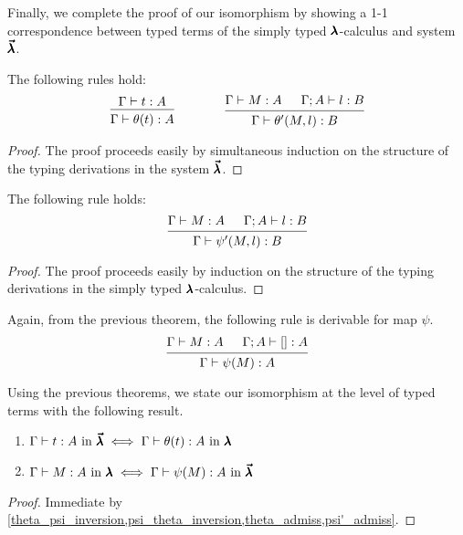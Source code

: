 Finally, we complete the proof of our isomorphism by showing a 1-1 correspondence between typed terms of the simply typed $\pmb{\lambda}$-calculus and system $\pmb{\vec \lambda}$.

\begin{theorem}
  \label{theta_admiss}
  The following rules hold:
  \[ \begin{prooftree}
      \hypo{ \Gamma \vdash t : A }
      \infer1{ \Gamma \vdash \theta(t) : A } 
    \end{prooftree}
    \qquad \qquad
    \begin{prooftree}
      \hypo{ \Gamma \vdash M : A }
      \hypo{ \Gamma ; A \vdash l : B }
      \infer2{ \Gamma \vdash \theta'(M, l) : B }.
    \end{prooftree} \]
\end{theorem}
\begin{proof}
  The proof proceeds easily by simultaneous induction on the structure of the typing derivations in the system $\pmb{\vec \lambda}$.
\end{proof}

\begin{theorem}
  \label{psi'_admiss}
  The following rule holds:
  \[ \begin{prooftree}
      \hypo{ \Gamma \vdash M : A }
      \hypo{ \Gamma ; A \vdash l : B }
      \infer2{ \Gamma \vdash \psi'(M, l) : B }.
    \end{prooftree} \]
\end{theorem}
\begin{proof}
  The proof proceeds easily by induction on the structure of the typing derivations in the simply typed $\pmb{\lambda}$-calculus.
\end{proof}

Again, from the previous theorem, the following rule is derivable for map $\psi$.
\[ \begin{prooftree}
    \hypo{ \Gamma \vdash M : A }
    \hypo{ \Gamma ; A \vdash [] : A }
    \infer2{ \Gamma \vdash \psi(M) : A }.
  \end{prooftree} \]

Using the previous theorems, we state our isomorphism at the level of typed terms with the following result.

\begin{corollary} \hfill
  \label{typing_isomorphism}
  \begin{enumerate}
  \item $\Gamma \vdash t:A \text{ in } \pmb{\vec \lambda} \iff \Gamma \vdash \theta(t):A  \text{ in } \pmb{\lambda}$
  \item $\Gamma \vdash M:A \text{ in } \pmb{\lambda} \iff \Gamma \vdash \psi(M):A \text{ in } \pmb{\vec \lambda}$
  \end{enumerate}
\end{corollary}
\begin{proof}
  Immediate by \cref{theta_psi_inversion,psi_theta_inversion,theta_admiss,psi'_admiss}.
\end{proof}

